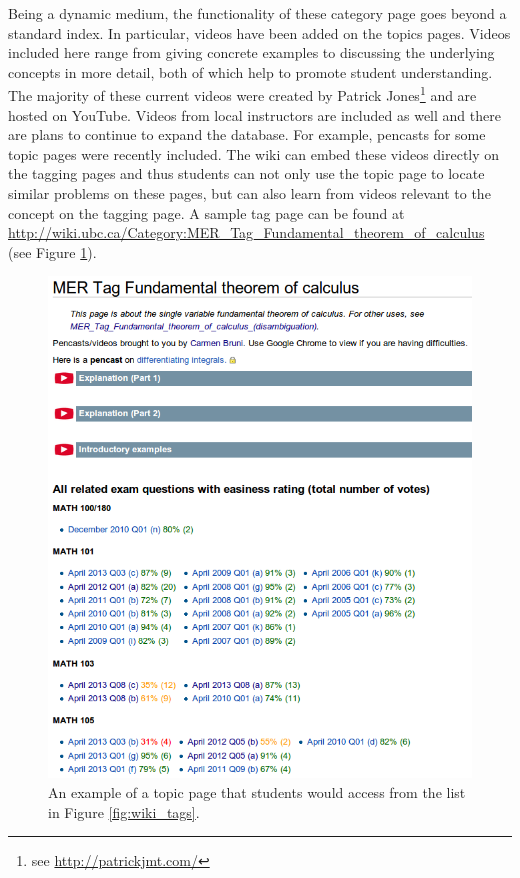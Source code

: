 \documentclass{primus}
\begin{document}
\noindent{}Being a dynamic medium, the functionality of these category page goes beyond a standard index. In particular, videos have been added on the topics pages. Videos included here range from giving concrete examples to discussing the underlying concepts in more detail, both of which help to promote student understanding. The majority of these current videos were created by Patrick Jones\footnote{see \url{http://patrickjmt.com/}} and are hosted on YouTube. Videos from local instructors are included as well and there are plans to continue to expand the database.  For example, pencasts for some topic pages were recently included. The wiki can embed these videos directly on the tagging pages and thus students can not only use the topic page to locate similar problems on these pages, but can also learn from videos relevant to the concept on the tagging page. A sample tag page can be found at \url{http://wiki.ubc.ca/Category:MER_Tag_Fundamental_theorem_of_calculus} (see Figure \ref{fig:topic_page}).

\begin{figure}[H]
\centering
\includegraphics[width=\textwidth]{figs/Topics_Page.png}
\caption{An example of a topic page that students would access from the list in Figure \ref{fig:wiki_tags}.}\label{fig:topic_page}
\end{figure}
\end{document}
